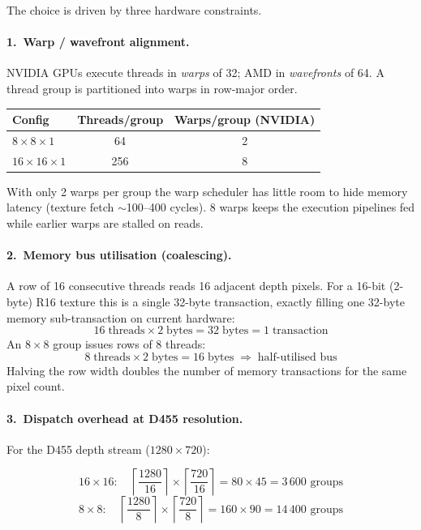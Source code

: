 \documentclass[11pt,a4paper]{article}
\begin{document}
The choice is driven by three hardware constraints.

\paragraph{1.\ Warp / wavefront alignment.}
NVIDIA GPUs execute threads in \emph{warps} of 32; AMD in \emph{wavefronts} of 64.
A thread group is partitioned into warps in row-major order.

\begin{center}
\renewcommand{\arraystretch}{1.3}
\begin{tabular}{lcc}
\toprule
\textbf{Config} & \textbf{Threads/group} & \textbf{Warps/group (NVIDIA)} \\
\midrule
$8\times8\times1$   & 64  & 2 \\
$16\times16\times1$ & 256 & 8 \\
\bottomrule
\end{tabular}
\end{center}

With only 2 warps per group the warp scheduler has little room to hide memory
latency (texture fetch $\sim$100--400 cycles).  8 warps keeps the execution
pipelines fed while earlier warps are stalled on reads.

\paragraph{2.\ Memory bus utilisation (coalescing).}
A row of 16 consecutive threads reads 16 adjacent depth pixels.
For a 16-bit (2-byte) R16 texture this is a single 32-byte transaction, exactly
filling one 32-byte memory sub-transaction on current hardware:
\[
16\;\text{threads} \times 2\;\text{bytes} = 32\;\text{bytes} = 1\;\text{transaction}
\]
An $8\times8$ group issues rows of 8 threads:
\[
8\;\text{threads} \times 2\;\text{bytes} = 16\;\text{bytes} \;\Rightarrow\; \text{half-utilised bus}
\]
Halving the row width doubles the number of memory transactions for the same pixel count.

\paragraph{3.\ Dispatch overhead at D455 resolution.}
For the D455 depth stream ($1280\times720$):

\[
16\times16:\quad \left\lceil\frac{1280}{16}\right\rceil \times \left\lceil\frac{720}{16}\right\rceil
= 80 \times 45 = 3\,600 \text{ groups}
\]
\[
8\times8:\quad \left\lceil\frac{1280}{8}\right\rceil \times \left\lceil\frac{720}{8}\right\rceil
= 160 \times 90 = 14\,400 \text{ groups}
\]
\end{document}
